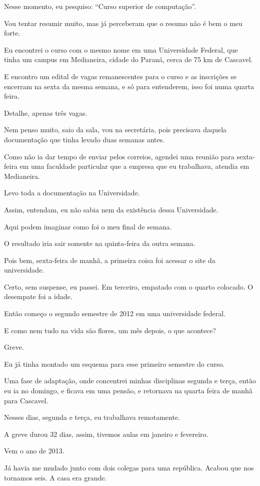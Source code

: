 Nesse momento, eu pesquiso: “Curso superior de computação”. 

Vou tentar resumir muito, mas já perceberam que o resumo não é bem o meu forte. 

Eu encontrei o curso com o mesmo nome em uma Universidade Federal, que tinha um campus em Medianeira, cidade do Paraná, cerca de 75 km de Cascavel. 

E encontro um edital de vagas remanescentes para o curso e as inscrições se encerram na sexta da mesma semana, e só para entenderem, isso foi numa quarta feira. 

Detalhe, apenas três vagas. 

Nem penso muito, saio da sala, vou na secretária, pois precisava daquela documentação que tinha levado duas semanas antes. 

Como não ia dar tempo de enviar pelos correios, agendei uma reunião para sexta-feira em uma faculdade particular que a empresa que eu trabalhava, atendia em Medianeira. 

Levo toda a documentação na Universidade. 

Assim, entendam, eu não sabia nem da existência dessa Universidade. 

Aqui podem imaginar como foi o meu final de semana. 

O resultado iria sair somente na quinta-feira da outra semana. 

Pois bem, sexta-feira de manhã, a primeira coisa foi acessar o site da universidade.
 
Certo, sem suspense, eu passei. Em terceiro, empatado com o quarto colocado. O desempate foi a idade. 

Então começo o segundo semestre de 2012 em uma universidade federal. 

E como nem tudo na vida são flores, um mês depois, o que acontece? 

Greve. 

Eu já tinha montado um esquema para esse primeiro semestre do curso. 

Uma fase de adaptação, onde concentrei minhas disciplinas segunda e terça, então eu ia no domingo, e ficava em uma pensão, e retornava na quarta feira de manhã para Cascavel. 

Nesses dias, segunda e terça, eu trabalhava remotamente. 

A greve durou 32 dias, assim, tivemos aulas em janeiro e fevereiro. 

Vem o ano de 2013.

Já havia me mudado junto com dois colegas para uma república. Acabou que nos tornamos seis. A casa era grande.

